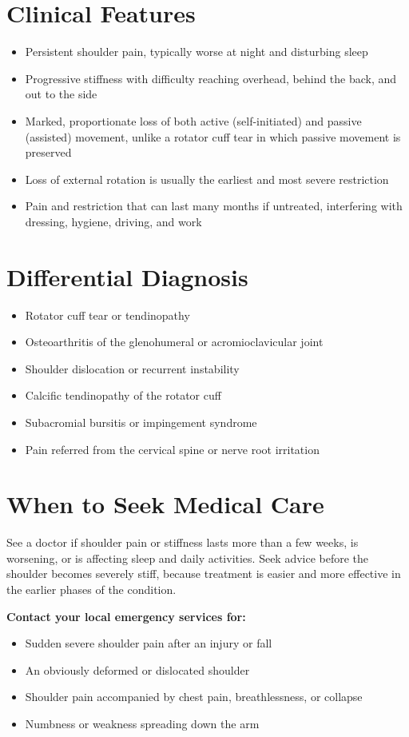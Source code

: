 \section*{Clinical Features}
\begin{itemize}
    \item Persistent shoulder pain, typically worse at night and disturbing sleep
    \item Progressive stiffness with difficulty reaching overhead, behind the back, and out to the side
    \item Marked, proportionate loss of both active (self-initiated) and passive (assisted) movement, unlike a rotator cuff tear in which passive movement is preserved
    \item Loss of external rotation is usually the earliest and most severe restriction
    \item Pain and restriction that can last many months if untreated, interfering with dressing, hygiene, driving, and work
\end{itemize}

\section*{Differential Diagnosis}
\begin{itemize}
    \item Rotator cuff tear or tendinopathy
    \item Osteoarthritis of the glenohumeral or acromioclavicular joint
    \item Shoulder dislocation or recurrent instability
    \item Calcific tendinopathy of the rotator cuff
    \item Subacromial bursitis or impingement syndrome
    \item Pain referred from the cervical spine or nerve root irritation
\end{itemize}

\section*{When to Seek Medical Care}
See a doctor if shoulder pain or stiffness lasts more than a few weeks, is worsening, or is affecting sleep and daily activities. Seek advice before the shoulder becomes severely stiff, because treatment is easier and more effective in the earlier phases of the condition.

\textbf{Contact your local emergency services for:}
\begin{itemize}
    \item Sudden severe shoulder pain after an injury or fall
    \item An obviously deformed or dislocated shoulder
    \item Shoulder pain accompanied by chest pain, breathlessness, or collapse
    \item Numbness or weakness spreading down the arm
\end{itemize}

